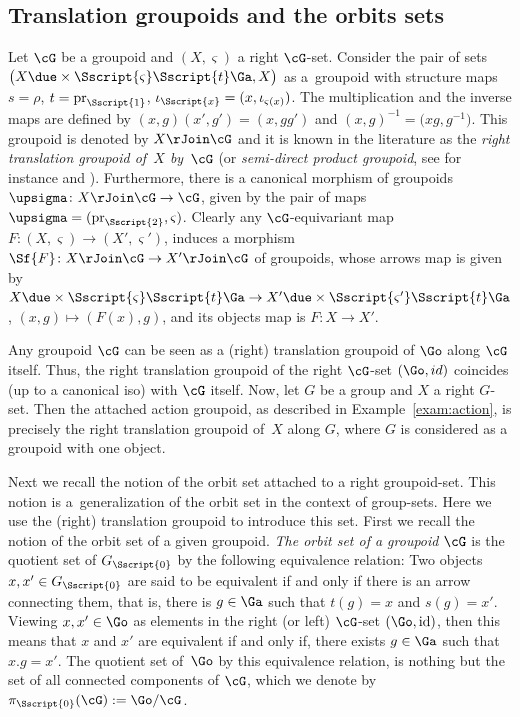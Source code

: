 \begin{Example}
\end{Example}

\subsection{Translation groupoids and the orbits sets}\label{ssec:Grpd12}
 Let $\cG$ be a groupoid and $(X,\varsigma)$ a right $\cG$-set. Consider the pair of sets $\big( X \due \times {\Sscript{\varsigma}} { \Sscript{{t}}} \Ga, X \big)$ as a~groupoid with structure maps ${s}=\rho$, $t={\rm pr}_{\Sscript{1}}$, $\iota_{\Sscript{x}}=(x,\iota_{\varsigma(x)})$. The multiplication and the inverse maps are defined by $(x,g)(x',g')=(x,gg')$ and $(x,g)^{-1}=\big(xg,g^{-1}\big)$. This groupoid is denoted by $X \rJoin \cG$ and it is known in the literature as the \emph{right translation groupoid of~$X$ by~$\cG$} (or \emph{semi-direct product groupoid}, see for instance \cite[p.~163]{Moedijk/Mrcun:2005} and \cite{Kaoutit/Kowalzig:14}). Furthermore, there is a canonical morphism of groupoids $\upsigma\colon X\rJoin \cG \to \cG$, given by the pair of maps $\upsigma=({\rm pr}_{\Sscript{2}}, \varsigma)$. Clearly any $\cG$-equivariant map $F\colon (X,\varsigma) \to (X',\varsigma')$, induces a morphism $\Sf{F}\colon X \rJoin \cG \to X' \rJoin \cG$ of groupoids, whose arrows map is given by $X \due \times {\Sscript{\varsigma}} { \Sscript{{t}}} \Ga \to X' \due \times {\Sscript{\varsigma'}} { \Sscript{{t}}} \Ga $, $(x, g) \mapsto (F(x), g)$, and its objects map is $F\colon X \to X'$.

\begin{Example}\label{exam:refereePacience}Any groupoid $\cG$ can be seen as a (right) translation groupoid of $\Go$ along $\cG$ itself. Thus, the right translation groupoid of the right $\cG$-set $(\Go, id)$ coincides (up to a canonical iso) with $\cG$ itself. Now, let $G$ be a group and $X$ a right $G$-set. Then the attached action groupoid, as described in Example~\ref{exam:action}, is precisely the right translation groupoid of~$X$ along $G$, where $G$ is considered as a groupoid with one object.
\end{Example}

Next we recall the notion of the orbit set attached to a right groupoid-set. This notion is a~generalization of the orbit set in the context of group-sets. Here we use the (right) translation groupoid to introduce this set.
First we recall the notion of the orbit set of a given groupoid. \emph{The orbit set of a groupoid} $\cG$ is the quotient set of $G_{\Sscript{0}}$ by the following equivalence relation: Two objects $x, x' \in G_{\Sscript{0}}$ are said to be equivalent if and only if there is an arrow connecting them, that is, there is $g \in\Ga$ such that $t(g)=x$ and $s(g)=x'$. Viewing $x, x' \in \Go$ as elements in the right (or left) $\cG$-set $(\Go, {\rm id})$, then this means that $x$ and $x'$ are equivalent if and only if, there exists $g \in \Ga$ such that $x . g=x'$. The quotient set of~$\Go$ by this equivalence relation, is nothing but the set of all connected components of $\cG$, which we denote by $\pi_{\Sscript{0}}(\cG):=\Go/\cG$.

